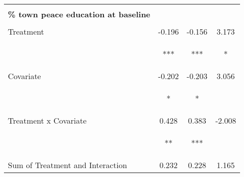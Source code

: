 \begin{tabular}{lccc}
 & \begin{footnotesize}[0.075]\end{footnotesize} & \begin{footnotesize}[0.069]\end{footnotesize} & \begin{footnotesize}[2.714]\end{footnotesize}\\
\noalign{\smallskip}\textbf{\% town peace education at baseline} &  &  & \\
 & \begin{footnotesize}\end{footnotesize} & \begin{footnotesize}\end{footnotesize} & \begin{footnotesize}\end{footnotesize}\\
\noalign{\smallskip}Treatment & -0.196 & -0.156 & 3.173\\
 & \begin{footnotesize}[0.056]***\end{footnotesize} & \begin{footnotesize}[0.045]***\end{footnotesize} & \begin{footnotesize}[1.782]*\end{footnotesize}\\
\noalign{\smallskip}Covariate & -0.202 & -0.203 & 3.056\\
 & \begin{footnotesize}[0.122]*\end{footnotesize} & \begin{footnotesize}[0.110]*\end{footnotesize} & \begin{footnotesize}[4.231]\end{footnotesize}\\
\noalign{\smallskip}Treatment x Covariate & 0.428 & 0.383 & -2.008\\
 & \begin{footnotesize}[0.167]**\end{footnotesize} & \begin{footnotesize}[0.141]***\end{footnotesize} & \begin{footnotesize}[5.535]\end{footnotesize}\\
\noalign{\smallskip}Sum of Treatment and Interaction & 0.232 & 0.228 & 1.165\\

\end{tabular}
